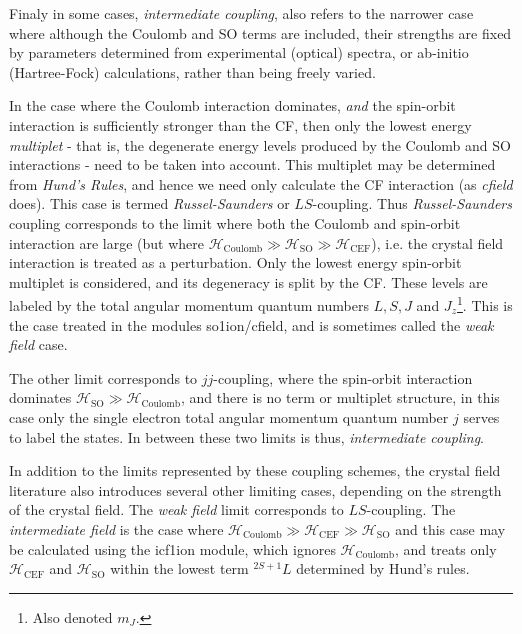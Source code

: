 Finaly in some cases, \emph{intermediate coupling}, also refers to the narrower case where although
the Coulomb and SO terms are included, their strengths are fixed by parameters determined from
experimental (optical) spectra, or ab-initio (Hartree-Fock) calculations, rather than being freely
varied.  

In the case where the Coulomb interaction dominates, \emph{and} the
spin-orbit interaction is sufficiently stronger than the CF, then only the lowest
energy \emph{multiplet} - that is, the degenerate energy levels produced by the Coulomb and SO
interactions - need to be taken into account. This multiplet may be determined from \emph{Hund's
Rules}, and hence we need only calculate the CF interaction (as \emph{cfield} does). This case is
termed \emph{Russel-Saunders} or $LS$-coupling. 
Thus  \emph{Russel-Saunders} coupling corresponds to the limit where
both the Coulomb and spin-orbit interaction are large (but where $\mathcal{H}_{\mathrm{Coulomb}}\gg
\mathcal{H}_{\mathrm{SO}}\gg
\mathcal{H}_{\mathrm{CEF}}$), i.e. the crystal field interaction is treated as a perturbation. Only
the lowest energy spin-orbit multiplet is considered, and its degeneracy is split by the CF. These
levels are labeled by the total angular momentum quantum numbers $L, S, J$ and $J_z$\footnote{Also
denoted $m_J$.}. This is the case treated in the modules {\prg so1ion}/{\prg cfield}, and is 
sometimes called the \emph{weak field} case.

The other limit corresponds to $jj$-coupling, where the spin-orbit interaction
dominates $\mathcal{H}_{\mathrm{SO}}\gg
\mathcal{H}_{\mathrm{Coulomb}}$, and there is no term or multiplet structure, 
in this case only the single electron total
angular momentum quantum number $j$ serves to label the states. 
In between these two limits is thus, \emph{intermediate coupling}. 

In addition to the limits represented by these coupling schemes, the crystal field literature
also introduces several other limiting cases, depending on the strength of the crystal
field. The \emph{weak field} limit corresponds to $LS$-coupling. The \emph{intermediate field} is
the case where $\mathcal{H}_{\mathrm{Coulomb}}\gg\mathcal{H}_{\mathrm{CEF}}\gg
\mathcal{H}_{\mathrm{SO}}$ and this case may be calculated using the {\prg icf1ion} module,
which ignores $\mathcal{H}_{\mathrm{Coulomb}}$, and treats only $\mathcal{H}_{\mathrm{CEF}}$ and
$\mathcal{H}_{\mathrm{SO}}$ within the lowest term $^{2S+1} L$ determined by Hund's rules.

